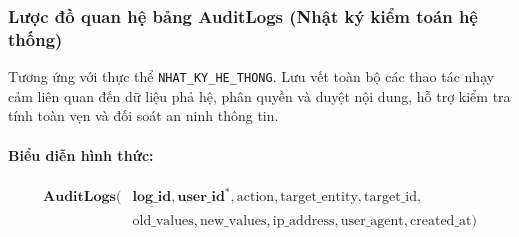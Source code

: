 \subsubsection{Lược đồ quan hệ bảng AuditLogs (Nhật ký kiểm toán hệ thống)}
Tương ứng với thực thể \texttt{NHAT\_KY\_HE\_THONG}. Lưu vết toàn bộ các thao tác nhạy cảm liên quan đến dữ liệu phả hệ, phân quyền và duyệt nội dung, hỗ trợ kiểm tra tính toàn vẹn và đối soát an ninh thông tin.

\paragraph{Biểu diễn hình thức:}
\[
\begin{aligned}
\textbf{AuditLogs}\big(
&\underline{\textbf{log\_id}}, \textbf{user\_id}^*, \text{action}, \text{target\_entity}, \text{target\_id}, \\
&\text{old\_values}, \text{new\_values}, \text{ip\_address}, \text{user\_agent}, \text{created\_at}
\big)
\end{aligned}
\]

